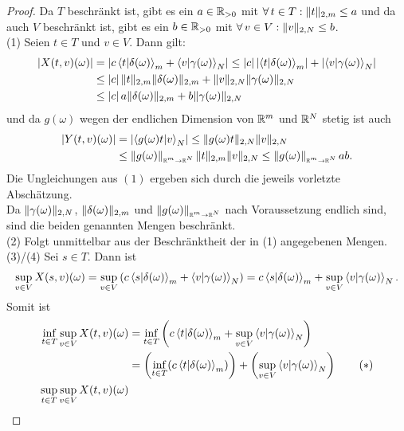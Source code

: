 \begin{proof} Da $T$ beschränkt ist, gibt es ein $a \in \mathbb{R}_{>0}$ mit
$\forall\, t \in T: \lVert t\rVert_{2, m} \le a$ und da auch $V$ beschränkt ist, gibt
es ein $b \in \mathbb{R}_{>0}$ mit $\forall\, v \in V: \lVert v\rVert_{2, N} \le b$.\\
(1) Seien $t \in T$ und $v \in V$. Dann gilt:
\begin{align*}
\left|X(t,v)(\omega)\right|&= \left|c \left\langle t |\delta(\omega)\right\rangle_m 
+ \left\langle v |\gamma(\omega)\right\rangle_N\right|
\le \left|c\right|\left|\left\langle t |\delta(\omega)\right\rangle_m\right|+\left|\left\langle v |\gamma(\omega)\right\rangle_N\right|\\
&\le \left|c\right| \lVert t\rVert_{2, m}\lVert\delta(\omega)\rVert_{2,m}
 + \lVert v\rVert_{2, N}\lVert\gamma(\omega)\rVert_{2, N}\\
&\le \left|c\right| a \lVert\delta(\omega)\rVert_{2,m} + b\lVert\gamma(\omega)\rVert_{2, N}
\end{align*}
und da $g(\omega)$ wegen der endlichen Dimension von $\mathbb{R}^m$ und $\mathbb{R}^N$ stetig
ist auch
\begin{align*}
\left|Y(t, v)(\omega)\right| &= 
\left|\left\langle g(\omega)t |v\right\rangle_N\right| \le \lVert g(\omega)t\rVert_{2,N}\lVert v\rVert_{2, N}\\
&\le \left\|g(\omega)\right\|_{\scriptscriptstyle{\ensuremath{\mathbb{R}}^m \rightarrow \ensuremath{\mathbb{R}}^N}} \lVert t\rVert_{2, m}\lVert v\rVert_{2, N}
\le \left\|g(\omega)\right\|_{\scriptscriptstyle{\ensuremath{\mathbb{R}}^m \rightarrow \ensuremath{\mathbb{R}}^N}} a b\text.
\end{align*}
Die Ungleichungen aus $(1)$ ergeben sich durch die jeweils vorletzte
Abschätzung.\\
Da $\lVert\gamma(\omega)\rVert_{2, N}$, $\lVert\delta(\omega)\rVert_{2,m}$ und
$\left\|g(\omega)\right\|_{\scriptscriptstyle{\ensuremath{\mathbb{R}}^m \rightarrow \ensuremath{\mathbb{R}}^N}}$ nach Voraussetzung endlich sind, sind die
beiden genannten Mengen beschränkt.\\
(2) Folgt unmittelbar aus der Beschränktheit der in (1) angegebenen Mengen.\\
(3)/(4) Sei $s \in T$. Dann ist
\begin{align*}\sup_{v \in V}X(s, v)(\omega) 
= \sup_{v\in V}\left(c\left\langle s |\delta(\omega)\right\rangle_m 
  + \left\langle v |\gamma(\omega)\right\rangle_N\right)
  = c\left\langle s |\delta(\omega)\right\rangle_m 
  + \sup_{v\in V}\left\langle v |\gamma(\omega)\right\rangle_N\text.\end{align*}
Somit ist
\begin{align*}
\inf_{t \in T}\sup_{v \in V}X(t, v)(\omega) &=
\inf_{t\in T}\left(c\sprod t {\delta(\omega)}_m 
  + \sup_{v\in V}\sprod v{\gamma(\omega)}_N \right)\\
  &=\left(\inf_{t \in T}(c\sprod t {\delta(\omega)} _m) \right)
  + \left(\sup_{v \in V}\sprod v {\gamma(\omega)}_N \right) \tag {$\ast$}\\
\sup_{t \in T}\sup_{v \in V}X(t, v)(\omega) 

\end{align*}
\end{proof}
